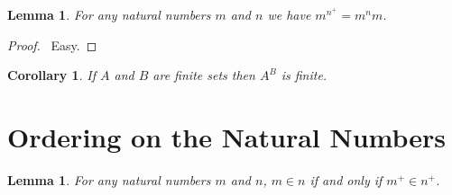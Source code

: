 \documentclass{report}
\let\qed\relax
\newtheorem{lemma}[axiom]{Lemma}
\newtheorem{corollary}{Corollary}[axiom]
\theoremstyle{definition}
\begin{document}
    \begin{lemma}
        For any natural numbers $m$ and $n$ we have $m^{n^+} = m^n m$.
    \end{lemma}

    \begin{proof}
        \pf\ Easy. \qed
    \end{proof}

    \begin{corollary}
        If $A$ and $B$ are finite sets then $A^B$ is finite.
    \end{corollary}

    \section{Ordering on the Natural Numbers}

    \begin{lemma}
        \label{lemma:natural_number_order_successor}
        For any natural numbers $m$ and $n$, $m \in n$ if and only if $m^+ \in n^+$.
    \end{lemma}
\end{document}
